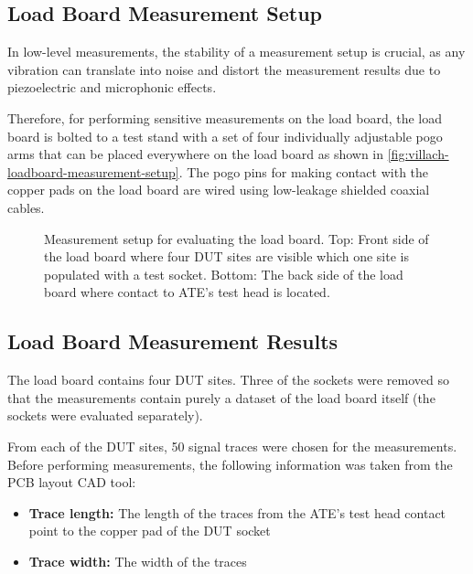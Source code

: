 \subsection{Load Board Measurement Setup}
\label{loadbaord-measurement-setup}

In low-level measurements, the stability of a measurement setup is crucial, as
any vibration can translate into noise and distort the
measurement results due to piezoelectric and microphonic effects.

Therefore, for performing sensitive measurements on the load board, the
load board is bolted to a test stand with a set of four individually adjustable
pogo arms that can be placed everywhere on the load board as shown in
\autoref{fig:villach-loadboard-measurement-setup}.
The pogo pins for making contact with the copper pads on the load board are
wired using low-leakage shielded coaxial cables.

\begin{figure}[htbp]
    \centering
    \caption[Load Board Measurement Setup]{
        Measurement setup for evaluating the load board.
        Top: Front side of the load board where four \acs{DUT} sites are visible
        which one site is populated with a test socket.
        Bottom: The back side of the load board where contact to \ac{ATE}'s
        test head is located.
    }
    \label{fig:villach-loadboard-measurement-setup}
\end{figure}

\subsection{Load Board Measurement Results}
\label{loadbaord-measurement-results}

The load board contains four \ac{DUT} sites.
Three of the sockets were removed so that the
measurements contain purely a dataset of the load board itself (the sockets
were evaluated separately).

From each of the \ac{DUT} sites, 50 signal traces were chosen for the
measurements.
Before performing measurements, the following information was taken
from the \ac{PCB} layout \ac{CAD} tool:

\begin{itemize}[topsep=8pt,itemsep=4pt,partopsep=4pt, parsep=4pt]
    \item \textbf{Trace length:} The length of the traces from the \ac{ATE}'s
    test head contact point to the copper pad of the \ac{DUT} socket
    \item \textbf{Trace width:} The width of the traces
\end{itemize}

